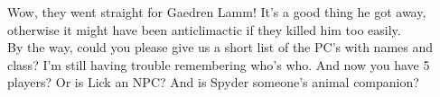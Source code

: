 Wow, they went straight for Gaedren Lamm! It's a good thing he got away, otherwise it might have been anticlimactic if they killed him too easily.\\

By the way, could you please give us a short list of the PC's with names and class? I'm still having trouble remembering who's who. And now you have 5 players? Or is Lick an NPC? And is Spyder someone's animal companion?\\

